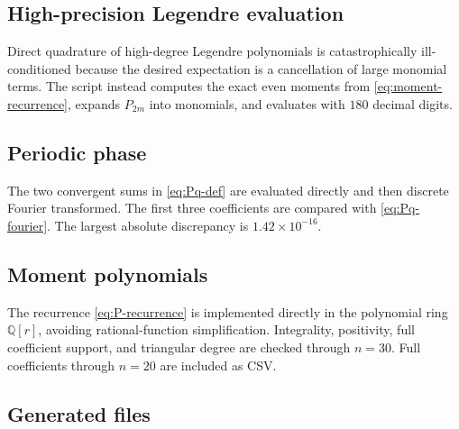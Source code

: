 \documentclass[11pt]{article}
\theoremstyle{definition}
\theoremstyle{remark}
\begin{document}
\subsection{High-precision Legendre evaluation}

Direct quadrature of high-degree Legendre polynomials is catastrophically ill-conditioned because the desired expectation is a cancellation of large monomial terms.  The script instead computes the exact even moments from \cref{eq:moment-recurrence}, expands $P_{2m}$ into monomials, and evaluates with $180$ decimal digits.

\subsection{Periodic phase}

The two convergent sums in \cref{eq:Pq-def} are evaluated directly and then discrete Fourier transformed.  The first three coefficients are compared with \cref{eq:Pq-fourier}.  The largest absolute discrepancy is $1.42\times10^{-16}$.

\subsection{Moment polynomials}

The recurrence \cref{eq:P-recurrence} is implemented directly in the polynomial ring $\mathbb Q[r]$, avoiding rational-function simplification.  Integrality, positivity, full coefficient support, and triangular degree are checked through $n=30$.  Full coefficients through $n=20$ are included as CSV.

\subsection{Generated files}
\end{document}
